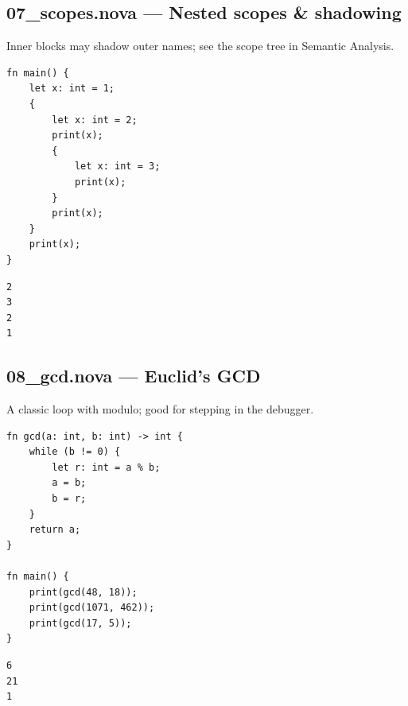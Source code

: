 \subsection*{07\_scopes.nova --- Nested scopes \& shadowing}
\noindent Inner blocks may shadow outer names; see the scope tree in Semantic Analysis.
\begin{lstlisting}[language=nova,]
fn main() {
    let x: int = 1;
    {
        let x: int = 2;
        print(x);
        {
            let x: int = 3;
            print(x);
        }
        print(x);
    }
    print(x);
}
\end{lstlisting}
\begin{tcolorbox}[colback=green!4,colframe=green!45!black,title={Program output (optimized VM)},fonttitle=\bfseries\small,boxsep=2pt,left=4pt,right=4pt,top=2pt,bottom=2pt]
\begin{lstlisting}[basicstyle=\ttfamily\scriptsize,frame=none,backgroundcolor=\color{white}]
2
3
2
1
\end{lstlisting}
\end{tcolorbox}
\subsection*{08\_gcd.nova --- Euclid's GCD}
\noindent A classic loop with modulo; good for stepping in the debugger.
\begin{lstlisting}[language=nova,]
fn gcd(a: int, b: int) -> int {
    while (b != 0) {
        let r: int = a % b;
        a = b;
        b = r;
    }
    return a;
}

fn main() {
    print(gcd(48, 18));
    print(gcd(1071, 462));
    print(gcd(17, 5));
}
\end{lstlisting}
\begin{tcolorbox}[colback=green!4,colframe=green!45!black,title={Program output (optimized VM)},fonttitle=\bfseries\small,boxsep=2pt,left=4pt,right=4pt,top=2pt,bottom=2pt]
\begin{lstlisting}[basicstyle=\ttfamily\scriptsize,frame=none,backgroundcolor=\color{white}]
6
21
1
\end{lstlisting}
\end{tcolorbox}
